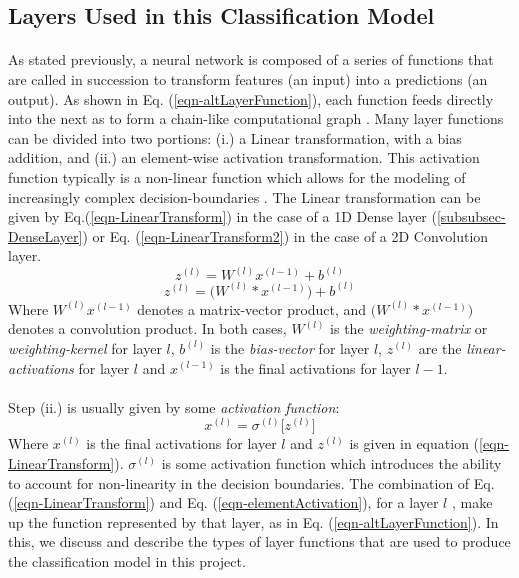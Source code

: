 \documentclass[12pt,letterpaper]{article}
\begin{document}

\subsection{Layers Used in this Classification Model}
\label{subsec-Layers}

\paragraph*{}As stated previously, a neural network is composed of a series of functions that are called in succession to transform features (an input) into a predictions (an output). As shown in Eq. (\ref{eqn-altLayerFunction}), each function feeds directly into the next as to form a chain-like computational graph \cite{Goodfellow}. Many layer functions can be divided into two portions: (i.) a Linear transformation, with a bias addition, and (ii.) an element-wise activation transformation. This activation function typically is a non-linear function which allows for the modeling of increasingly complex decision-boundaries \cite{Geron,Loy}. The Linear transformation can be given by Eq.(\ref{eqn-LinearTransform}) in the case of a 1D Dense layer (\ref{subsubsec-DenseLayer}) or Eq. (\ref{eqn-LinearTransform2}) in the case of a 2D Convolution layer.
\begin{equation}
\label{eqn-LinearTransform}
z^{(l)} = W^{(l)} x^{(l-1)} + b^{(l)}
\end{equation}
\begin{equation}
\label{eqn-LinearTransform2}
z^{(l)} = \big(W^{(l)} * x^{(l-1)}\big) + b^{(l)}
\end{equation} 
Where $W^{(l)} x^{(l-1)}$ denotes a matrix-vector product, and $\big(W^{(l)} * x^{(l-1)}\big)$ denotes a convolution product. In both cases, $W^{(l)}$ is the \textit{weighting-matrix} or \textit{weighting-kernel} for layer $l$, $b^{(l)}$ is the \textit{bias-vector} for layer $l$, $z^{(l)}$ are the \textit{linear-activations} for layer $l$ and $x^{(l-1)}$ is the final activations for layer $l-1$.

\paragraph*{}Step (ii.) is usually given by some \textit{activation function}:
\begin{equation}
\label{eqn-elementActivation}
x^{(l)} = \sigma^{(l)} \big[ z^{(l)} \big]
\end{equation}
Where $x^{(l)}$ is the final activations for layer $l$ and $z^{(l)}$ is given in equation (\ref{eqn-LinearTransform}). $\sigma^{(l)}$ is some activation function which introduces the ability to account for non-linearity in the decision boundaries. The combination of Eq. (\ref{eqn-LinearTransform}) and Eq. (\ref{eqn-elementActivation}), for a layer $l$ , make up the function represented by that layer, as in Eq. (\ref{eqn-altLayerFunction}). In this, we discuss and describe the types of layer functions that are used to produce the classification model in this project.
\end{document}
